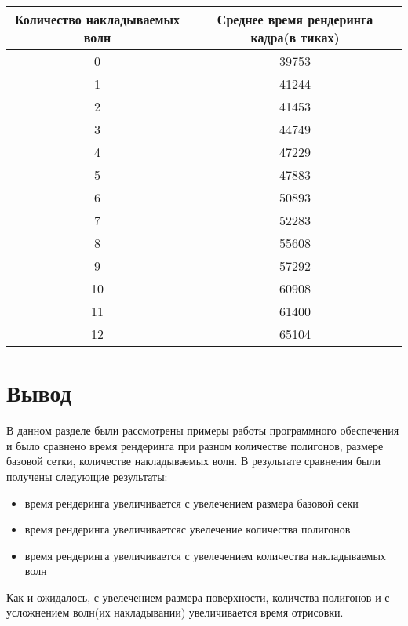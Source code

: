 \begin{table}[h!]
	\caption{}
	\label{tab:wave}
	\begin{center}
		\begin{tabular}{|c | c|} 
			\hline
			Количество накладываемых волн & Среднее время рендеринга кадра(в тиках) \\  
			\hline
			0 & 39753  \\
			\hline
			1 & 41244  \\
			\hline
			2 &  41453 \\
			\hline
			3 &  44749 \\
			\hline
			4 &  47229  \\
			\hline
			5 &  47883  \\
			\hline
			6 &  50893  \\
			\hline
			7 & 52283  \\
			\hline
			8 & 55608  \\
			\hline
			9 & 57292  \\
			\hline
			10 &  60908 \\
			\hline
			11 & 61400 \\
			\hline
			12 & 65104  \\
			\hline
		\end{tabular}
	\end{center}
\end{table}

\newpage
\section*{Вывод}

В данном разделе были рассмотрены примеры работы программного обеспечения и было сравнено время рендеринга при разном количестве полигонов, размере базовой сетки, количестве накладываемых волн. В результате сравнения были получены следующие результаты:

\begin{itemize}
	\item время рендеринга увеличивается с увелечением размера базовой секи
	\item время рендеринга увеличиваетсяс увелечение  количества полигонов
	\item время рендеринга увеличивается  с увелечением количества накладываемых волн
\end{itemize}

Как и ожидалось, с увелечением размера поверхности, количства полигонов и с усложнением волн(их накладывании) увеличивается время отрисовки.




